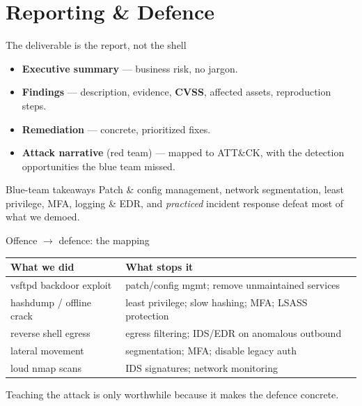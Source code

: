 \documentclass[aspectratio=169,11pt]{beamer}
\begin{document}
\section{Reporting \& Defence}
\begin{frame}{The deliverable is the report, not the shell}
  \begin{itemize}
    \item \textbf{Executive summary} --- business risk, no jargon.
    \item \textbf{Findings} --- description, evidence, \textbf{CVSS}, affected
          assets, reproduction steps.
    \item \textbf{Remediation} --- concrete, prioritized fixes.
    \item \textbf{Attack narrative} (red team) --- mapped to ATT\&CK, with the
          detection opportunities the blue team missed.
  \end{itemize}
  \begin{block}{Blue-team takeaways}
    Patch \& config management, network segmentation, least privilege, MFA,
    logging \& EDR, and \emph{practiced} incident response defeat most of what we
    demoed.
  \end{block}
\end{frame}

\begin{frame}{Offence $\to$ defence: the mapping}
  \begin{table}\footnotesize
  \begin{tabular}{@{}p{5.2cm}p{6.2cm}@{}}\toprule
  \textbf{What we did} & \textbf{What stops it} \\ \midrule
  vsftpd backdoor exploit & patch/config mgmt; remove unmaintained services \\
  hashdump / offline crack & least privilege; slow hashing; MFA; LSASS protection \\
  reverse shell egress & egress filtering; IDS/EDR on anomalous outbound \\
  lateral movement & segmentation; MFA; disable legacy auth \\
  loud nmap scans & IDS signatures; network monitoring \\
  \bottomrule\end{tabular}\end{table}
  \footnotesize Teaching the attack is only worthwhile because it makes the
  defence concrete.
\end{frame}
\end{document}
